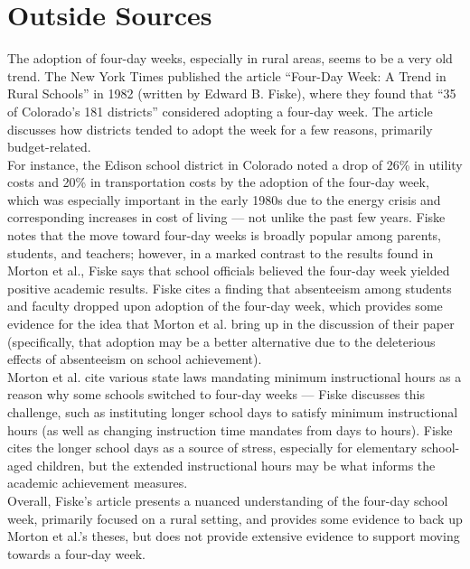 \documentclass[8pt]{extarticle}
\begin{document}
  \section{Outside Sources}%
  The adoption of four-day weeks, especially in rural areas, seems to be a very old trend. The New York Times published the article ``Four-Day Week: A Trend in Rural Schools'' in 1982 (written by Edward B. Fiske)\supercite{fiske_four-day_1982}, where they found that ``35 of Colorado's 181 districts'' considered adopting a four-day week. The article discusses how districts tended to adopt the week for a few reasons, primarily budget-related.\\

  For instance, the Edison school district in Colorado noted a drop of 26\% in utility costs and 20\% in transportation costs by the adoption of the four-day week, which was especially important in the early 1980s due to the energy crisis and corresponding increases in cost of living --- not unlike the past few years. Fiske notes that the move toward four-day weeks is broadly popular among parents, students, and teachers; however, in a marked contrast to the results found in Morton et al., Fiske says that school officials believed the four-day week yielded positive academic results. Fiske cites a finding that absenteeism among students and faculty dropped upon adoption of the four-day week, which provides some evidence for the idea that Morton et al. bring up in the discussion of their paper (specifically, that adoption may be a better alternative due to the deleterious effects of absenteeism on school achievement).\\

  Morton et al. cite various state laws mandating minimum instructional hours as a reason why some schools switched to four-day weeks --- Fiske discusses this challenge, such as instituting longer school days to satisfy minimum instructional hours (as well as changing instruction time mandates from days to hours). Fiske cites the longer school days as a source of stress, especially for elementary school-aged children, but the extended instructional hours may be what informs the academic achievement measures.\\

  Overall, Fiske's article presents a nuanced understanding of the four-day school week, primarily focused on a rural setting, and provides some evidence to back up Morton et al.'s theses, but does not provide extensive evidence to support moving towards a four-day week.
  \printbibliography
\end{document}
